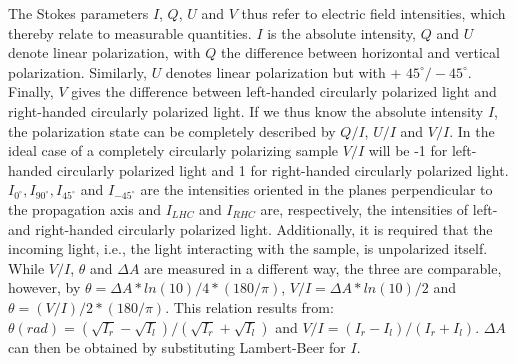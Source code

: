 \documentclass[review]{elsarticle}
\begin{document}
The Stokes parameters $I$, $Q$, $U$ and $V$ thus refer to electric field intensities, which thereby relate to measurable quantities. $I$ is the absolute intensity, $Q$ and $U$ denote linear polarization, with $Q$ the difference between horizontal and vertical polarization. Similarly, $U$ denotes linear polarization but with + $45^{\circ}/-45^{\circ}$. Finally, $V$ gives the difference between left-handed circularly polarized light and right-handed circularly polarized light. If we thus know the absolute intensity $I$, the polarization state can be completely described by $Q/I$, $U/I$ and $V/I$. In the ideal case of a completely circularly polarizing sample $V/I$ will be -1 for left-handed circularly polarized light and 1 for right-handed circularly polarized light. $I_{0^{\circ}}, I_{90^{\circ}}, I_{45^{\circ}}$ and $I_{-45^{\circ}}$ are the intensities oriented in the planes perpendicular to the propagation axis and $I_{LHC}$ and $I_{RHC}$ are, respectively, the intensities of left- and right-handed circularly polarized light.  Additionally, it is required that the incoming light, i.e., the light interacting with the sample, is unpolarized itself. While $V/I$, $\theta$ and $\Delta A$ are measured in a different way, the three are comparable, however, by $\theta = \Delta A * ln(10)/4 * (180/\pi)$, $V/I = \Delta A * ln(10)/2$ and $\theta = (V/I)/2 * (180/\pi)$. This relation results from: $\theta (rad) = (\sqrt{I_{r}}-\sqrt{I_{l}})/(\sqrt{I_{r}}+\sqrt{I_{l}})$ and $V/I =  (I_{r}-I_{l})/(I_{r}+I_{l})$. $\Delta A$ can then be obtained by substituting Lambert-Beer for $I$.
\end{document}
